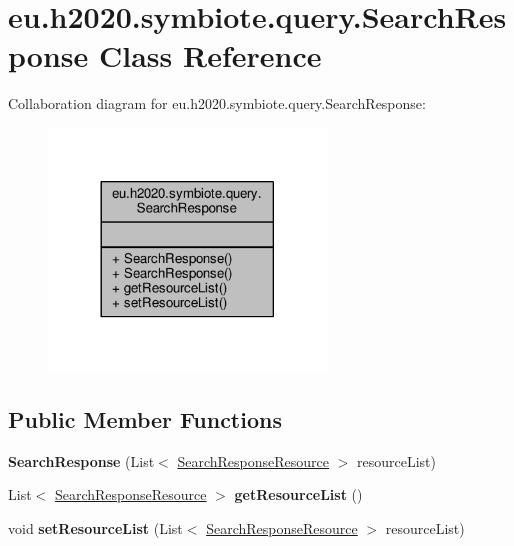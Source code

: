 \hypertarget{classeu_1_1h2020_1_1symbiote_1_1query_1_1SearchResponse}{}\section{eu.\+h2020.\+symbiote.\+query.\+Search\+Response Class Reference}
\label{classeu_1_1h2020_1_1symbiote_1_1query_1_1SearchResponse}


Collaboration diagram for eu.\+h2020.\+symbiote.\+query.\+Search\+Response\+:
\nopagebreak
\begin{figure}[H]
\begin{center}
\leavevmode
\includegraphics[width=209pt]{classeu_1_1h2020_1_1symbiote_1_1query_1_1SearchResponse__coll__graph}
\end{center}
\end{figure}
\subsection*{Public Member Functions}
\begin{DoxyCompactItemize}
\item 
{\bfseries Search\+Response} (List$<$ \hyperlink{classeu_1_1h2020_1_1symbiote_1_1query_1_1SearchResponseResource}{Search\+Response\+Resource} $>$ resource\+List)\hypertarget{classeu_1_1h2020_1_1symbiote_1_1query_1_1SearchResponse_a9138f72bc4db26c6bd99e9f9a1056178}{}\label{classeu_1_1h2020_1_1symbiote_1_1query_1_1SearchResponse_a9138f72bc4db26c6bd99e9f9a1056178}

\item 
List$<$ \hyperlink{classeu_1_1h2020_1_1symbiote_1_1query_1_1SearchResponseResource}{Search\+Response\+Resource} $>$ {\bfseries get\+Resource\+List} ()\hypertarget{classeu_1_1h2020_1_1symbiote_1_1query_1_1SearchResponse_ab07365c07e7f809df1f9f5133ddd7a11}{}\label{classeu_1_1h2020_1_1symbiote_1_1query_1_1SearchResponse_ab07365c07e7f809df1f9f5133ddd7a11}

\item 
void {\bfseries set\+Resource\+List} (List$<$ \hyperlink{classeu_1_1h2020_1_1symbiote_1_1query_1_1SearchResponseResource}{Search\+Response\+Resource} $>$ resource\+List)\hypertarget{classeu_1_1h2020_1_1symbiote_1_1query_1_1SearchResponse_af12485f7910ec0f088ef8d45d2c524aa}{}\label{classeu_1_1h2020_1_1symbiote_1_1query_1_1SearchResponse_af12485f7910ec0f088ef8d45d2c524aa}

\end{DoxyCompactItemize}


